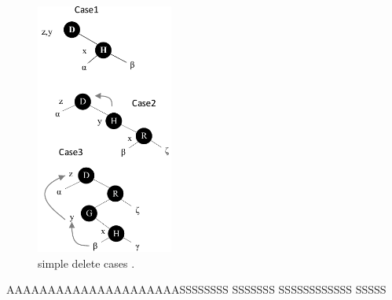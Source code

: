 \documentclass[draft=on]{scrbook}
\begin{document}
\begin{minipage}{.5\textwidth}
    \begin{figure}[h] %
		\includegraphics[width=0.4\textwidth]{vector/red-black-tree/delete/rb_delete_cases_single.pdf} %
		\caption{ simple delete cases .  } %
		\label{rb_delete_cases_single} %
	\end{figure}%
\end{minipage}

AAAAAAAAAAAAAAAAAAAAASSSSSSSS SSSSSSS SSSSSSSSSSSS SSSSS
\end{document}
